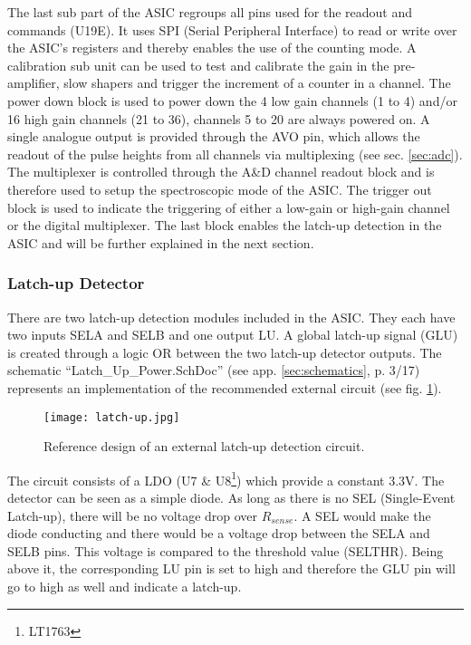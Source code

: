 The last sub part of the ASIC regroups all pins used for the readout and commands (U19E).
It uses SPI (Serial Peripheral Interface) to read or write over the ASIC's registers and thereby enables the use of the counting mode.
A calibration sub unit can be used to test and calibrate the gain in the pre-amplifier, slow shapers and trigger the increment of a counter in a channel.
The power down block is used to power down the 4 low gain channels (1 to 4) and/or 16 high gain channels (21 to 36), channels 5 to 20 are always powered on.
A single analogue output is provided through the AVO pin, which allows the readout of the pulse heights from all channels via multiplexing (see sec. \ref{sec:adc}).
The multiplexer is controlled through the A\&D channel readout block and is therefore used to setup the spectroscopic mode of the ASIC.
The trigger out block is used to indicate the triggering of either a low-gain or high-gain channel or the digital multiplexer.
The last block enables the latch-up detection in the ASIC and will be further explained in the next section.\cite{Meier2016VATA466}

\subsubsection{Latch-up Detector}
\label{sec:latchup_detector}
There are two latch-up detection modules included in the ASIC.
They each have two inputs SELA and SELB and one output LU.
A global latch-up signal (GLU) is created through a logic OR between the two latch-up detector outputs.
The schematic ``Latch\_Up\_Power.SchDoc'' (see app. \ref{sec:schematics}, p. 3/17) represents an implementation of the recommended external circuit (see fig. \ref{fig:latch-up}).
\begin{figure}[H]
    \centering
    \texttt{[image: latch-up.jpg]}
    \caption[Latch-up Detection Module]{Reference design of an external latch-up detection circuit.\cite[p. 66, fig. 12]{Meier2016VATA466}}
    \label{fig:latch-up}
\end{figure}

The circuit consists of a LDO (U7 \& U8\footnote{LT1763}) which provide a constant 3.3V.
The detector can be seen as a simple diode.
As long as there is no SEL (Single-Event Latch-up), there will be no voltage drop over $R_{sense}$.
A SEL would make the diode conducting and there would be a voltage drop between the SELA and SELB pins.
This voltage is compared to the threshold value (SELTHR).
Being above it, the corresponding LU pin is set to high and therefore the GLU pin will go to high as well and indicate a latch-up.\cite[p. 66-68, fig. 12]{Meier2016VATA466}

